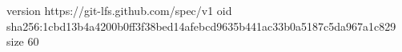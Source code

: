 version https://git-lfs.github.com/spec/v1
oid sha256:1cbd13b4a4200b0ff3f38bed14afebcd9635b441ac33b0a5187c5da967a1c829
size 60
